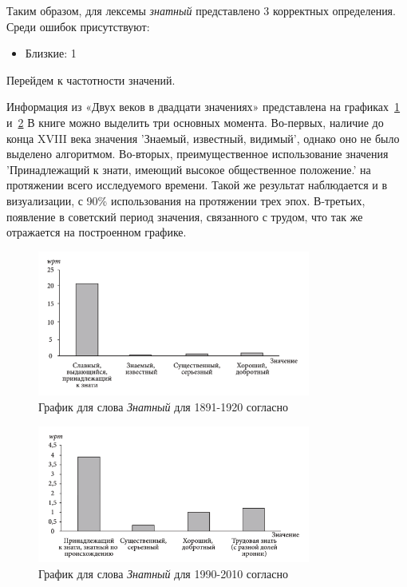 Таким образом, для лексемы \textit{знатный} представлено 3 корректных определения.
Среди ошибок присутствуют:
\begin{itemize}
    \item Близкие: 1
\end{itemize}

Перейдем к частотности значений.

Информация из «Двух веков в двадцати значениях» представлена на графиках~\ref{fig:TwoCentruriesZnatniy1} и~\ref{fig:TwoCentruriesZnatniy2}
В книге можно выделить три основных момента.
Во-первых, наличие до конца XVIII века значения ’Знаемый, известный, видимый’,
однако оно не было выделено алгоритмом.
Во-вторых, преимущественное использование значения
’Принадлежащий к знати, имеющий высокое общественное положение.’ на протяжении
всего исследуемого времени.
Такой же результат наблюдается и в визуализации, с 90\% использования на протяжении трех эпох.
В-третьих, появление в советский период значения, связанного с трудом,
что так же отражается на построенном графике.

\noindent %
\begin{figure}[H]
    \centering %
    \includegraphics[width=0.8\textwidth]{img/book/znatnij/1891-1920}
    \caption{График для слова \textit{Знатный} для 1891-1920 согласно~\cite{TwoCenturies}}
    \label{fig:TwoCentruriesZnatniy1}
\end{figure}


\begin{figure}[H]
    \centering %
    \includegraphics[width=0.8\textwidth]{img/book/znatnij/1990-2010}
    \caption{График для слова \textit{Знатный} для 1990-2010 согласно~\cite{TwoCenturies}}
    \label{fig:TwoCentruriesZnatniy2}
\end{figure}

